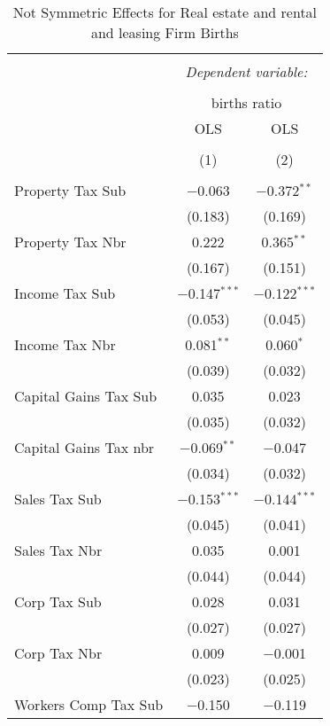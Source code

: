 
\begin{table}[!htbp] \centering 
  \caption{Not Symmetric Effects for  Real estate and rental and leasing Firm Births} 
  \label{53noequality} 
\footnotesize 
\begin{tabular}{@{\extracolsep{5pt}}lcc} 
\\[-1.8ex]\hline 
\hline \\[-1.8ex] 
 & \multicolumn{2}{c}{\textit{Dependent variable:}} \\ 
\cline{2-3} 
\\[-1.8ex] & \multicolumn{2}{c}{births ratio} \\ 
 & OLS & OLS \\ 
\\[-1.8ex] & (1) & (2)\\ 
\hline \\[-1.8ex] 
 Property Tax Sub & $-$0.063 & $-$0.372$^{**}$ \\ 
  & (0.183) & (0.169) \\ 
  Property Tax Nbr & 0.222 & 0.365$^{**}$ \\ 
  & (0.167) & (0.151) \\ 
  Income Tax Sub & $-$0.147$^{***}$ & $-$0.122$^{***}$ \\ 
  & (0.053) & (0.045) \\ 
  Income Tax Nbr & 0.081$^{**}$ & 0.060$^{*}$ \\ 
  & (0.039) & (0.032) \\ 
  Capital Gains Tax Sub & 0.035 & 0.023 \\ 
  & (0.035) & (0.032) \\ 
  Capital Gains Tax nbr & $-$0.069$^{**}$ & $-$0.047 \\ 
  & (0.034) & (0.032) \\ 
  Sales Tax Sub & $-$0.153$^{***}$ & $-$0.144$^{***}$ \\ 
  & (0.045) & (0.041) \\ 
  Sales Tax Nbr & 0.035 & 0.001 \\ 
  & (0.044) & (0.044) \\ 
  Corp Tax Sub & 0.028 & 0.031 \\ 
  & (0.027) & (0.027) \\ 
  Corp Tax Nbr & 0.009 & $-$0.001 \\ 
  & (0.023) & (0.025) \\ 
  Workers Comp Tax Sub & $-$0.150 & $-$0.119 \\ 

\end{tabular}
\end{table}
